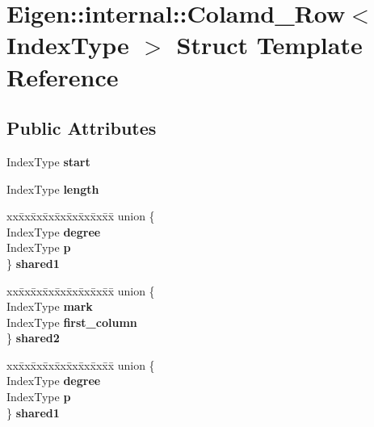 \hypertarget{struct_eigen_1_1internal_1_1_colamd___row}{}\section{Eigen\+:\+:internal\+:\+:Colamd\+\_\+\+Row$<$ Index\+Type $>$ Struct Template Reference}
\label{struct_eigen_1_1internal_1_1_colamd___row}
\subsection*{Public Attributes}
\begin{DoxyCompactItemize}
\item 
\mbox{\label{struct_eigen_1_1internal_1_1_colamd___row_a41f05e0dd97a417777b381619fedc697}} 
Index\+Type {\bfseries start}
\item 
\mbox{\label{struct_eigen_1_1internal_1_1_colamd___row_adc72231f189d3b0d648e400e48a72173}} 
Index\+Type {\bfseries length}
\item 
\mbox{\label{struct_eigen_1_1internal_1_1_colamd___row_aeeaecd307fa538213f8adc1ef6185c8d}} 
\begin{tabbing}
xx\=xx\=xx\=xx\=xx\=xx\=xx\=xx\=xx\=\kill
union \{\\
\>IndexType {\bfseries degree}\\
\>IndexType {\bfseries p}\\
\} {\bfseries shared1}\\

\end{tabbing}\item 
\mbox{\label{struct_eigen_1_1internal_1_1_colamd___row_af1e1ff596ace93fa0f00d749b231e215}} 
\begin{tabbing}
xx\=xx\=xx\=xx\=xx\=xx\=xx\=xx\=xx\=\kill
union \{\\
\>IndexType {\bfseries mark}\\
\>IndexType {\bfseries first\_column}\\
\} {\bfseries shared2}\\

\end{tabbing}\item 
\mbox{\label{struct_eigen_1_1internal_1_1_colamd___row_af398f4eb5ca618626c8a714f6584bc8d}} 
\begin{tabbing}
xx\=xx\=xx\=xx\=xx\=xx\=xx\=xx\=xx\=\kill
union \{\\
\>IndexType {\bfseries degree}\\
\>IndexType {\bfseries p}\\
\} {\bfseries shared1}\\


\end{tabbing}
\end{DoxyCompactItemize}
